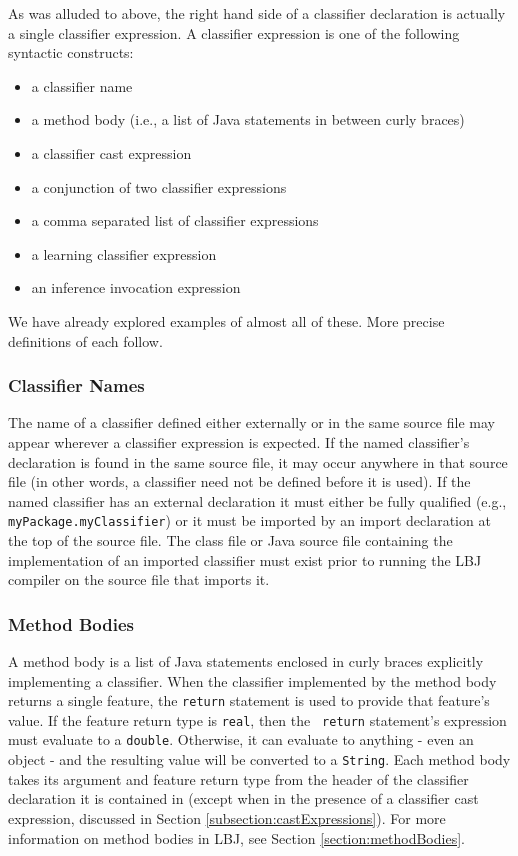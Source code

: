 As was alluded to above, the right hand side of a classifier declaration is
actually a single classifier expression.  A classifier expression is one of
the following syntactic constructs:

\begin{itemize}
\item a classifier name
\item a method body (i.e., a list of Java statements in between curly braces)
\item a classifier cast expression
\item a conjunction of two classifier expressions
\item a comma separated list of classifier expressions
\item a learning classifier expression
\item an inference invocation expression
\end{itemize}

\noindent
We have already explored examples of almost all of these.  More precise
definitions of each follow.

\subsubsection{Classifier Names} \label{subsection:classifierNames}
The name of a classifier defined either externally or in the same source file
may appear wherever a classifier expression is expected.  If the named
classifier's declaration is found in the same source file, it may occur
anywhere in that source file (in other words, a classifier need not be defined
before it is used).  If the named classifier has an external declaration it
must either be fully qualified (e.g., {\tt myPackage.myClassifier}) or it must
be imported by an import declaration at the top of the source file.  The class
file or Java source file containing the implementation of an imported
classifier must exist prior to running the LBJ compiler on the source file
that imports it.

\subsubsection{Method Bodies}
A method body is a list of Java statements enclosed in curly braces explicitly
implementing a classifier.  When the classifier implemented by the method body
returns a single feature, the {\tt return} statement is used to provide that
feature's value.  If the feature return type is {\tt real}, then the {\tt
return} statement's expression must evaluate to a {\tt double}.  Otherwise, it
can evaluate to anything - even an object - and the resulting value will be
converted to a {\tt String}.  Each method body takes its argument and feature
return type from the header of the classifier declaration it is contained in
(except when in the presence of a classifier cast expression, discussed in
Section \ref{subsection:castExpressions}).  For more information on method
bodies in LBJ, see Section \ref{section:methodBodies}.

